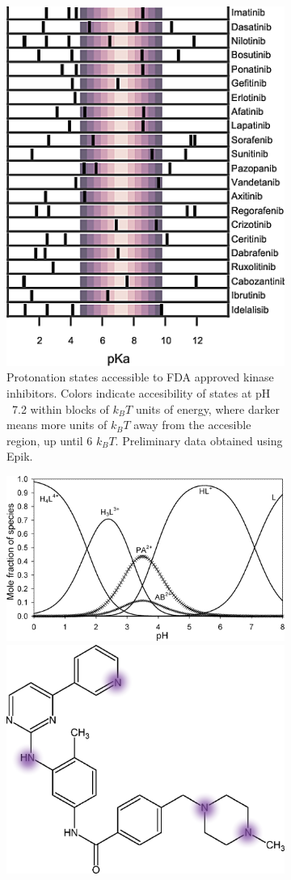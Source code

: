 \documentclass[10pt,final]{article}
\newcommand{\pH}{p$\mathrm{H}$\ }
\begin{document}
\begin{figure}[H]
\centering
\begin{subfigure}{.5\textwidth}
  \centering
	\includegraphics[width=0.7\linewidth]{figures/inhibitor-pKas.png}
	\caption{Protonation states accessible to FDA approved kinase inhibitors. Colors indicate accesibility of states at \pH 7.2 within blocks of $k_BT$ units of energy, where darker means more units of $k_BT$ away from the accesible region, up until 6 $k_BT$. Preliminary data obtained using Epik.~\cite{Shelley2007a,Greenwood2010a}}
	\label{figure:pka-kinase}
\end{subfigure}%
\begin{subfigure}{.5\textwidth}
  \centering
  \includegraphics[width=0.6\linewidth]{figures/imatinib_curve.png}
  \includegraphics[width=0.5\linewidth]{figures/imatinib_groups.png}

\end{subfigure}
\end{figure}
\end{document}
